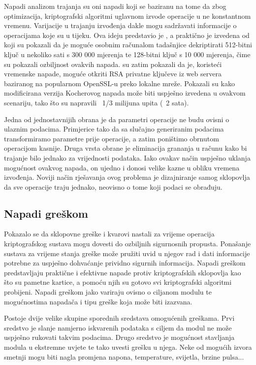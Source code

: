 \documentclass[times, utf8, diplomski]{fer}
\begin{document}
Napadi analizom trajanja  su oni napadi koji se baziranu na tome da zbog optimizacija, kriptografski algoritmi uglavnom izvode operacije u ne konstantnom vremenu. Varijacije u trajanju izvođenja dakle mogu sadržavati informacije o operacijama koje su u tijeku. Ova ideju predstavio je \cite{kocher1996timing}, a praktično je izvedena od \cite{dhem1998practical} koji su pokazali da je moguće osobnim računalom tadašnjice dekriptirati 512-bitni ključ u nekoliko sati s 300 000 mjerenja te 128-bitni ključ s 10 000 mjerenja, čime su pokazali ozbiljnost ovakvih napada. \cite{brumley2005remote} su zatim pokazali da je, koristeći vremenske napade, moguće otkriti RSA privatne ključeve iz web servera baziranog na popularnom OpenSSL-u preko lokalne mreže. Pokazali su kako modificirana verzija Kocherovog napada može biti uspješno izvedena u ovakvom scenariju, tako što su napravili ~1/3 milijuna upita (~2 sata).

Jedna od jednostavnijih obrana je da parametri operacije ne budu ovisni o ulaznim podacima. Primjerice tako da sa slučajno generiranim podacima transformiramo parametre prije operacije, a zatim poništimo obrnutom operacijom kasnije. Druga vrsta obrane je eliminacija grananja u računu kako bi trajanje bilo jednako za vrijednosti podataka. Iako ovakav način uspješno uklanja mogućnost ovakvog napada, on ujedno i donosi velike kazne u obliku vremena izvođenja. Noviji način rješavanja ovog problema je dizajniranje samog sklopovlja da sve operacije traju jednako, neovisno o tome koji podaci se obrađuju.


\subsection{Napadi greškom}

Pokazalo se da sklopovne greške i kvarovi nastali za vrijeme operacija kriptografskog sustava mogu dovesti do ozbiljnih sigurnosnih propusta. Ponašanje sustava za vrijeme stanja greške može pružiti uvid u njegov rad i dati informacije potrebne za uspješno dohvaćanje prividno sigurnih informacija. Napadi greškom  predstavljaju praktične i efektivne napade protiv kriptografskih sklopovlja kao što su pametne kartice, a pomoću njih su gotovo svi kriptografski algoritmi probijeni. Napadi greškom jako variraju ovisno o ciljanom modulu te mogućnostima napadača i tipu greške koja može biti izazvana.

Postoje dvije velike skupine sporednih sredstava omogućenih greškama. Prvi sredstvo je slanje namjerno iskvarenih podataka s ciljem da modul ne može uspješno rukovati takvim podacima. Drugo sredstvo je mogućnost stavljanja modula u ekstremne uvjete te tako uvesti grešku u njega. Neke od mogućih izvora smetnji mogu biti nagla promjena napona, temperature, svijetla, brzine pulsa...
\end{document}
